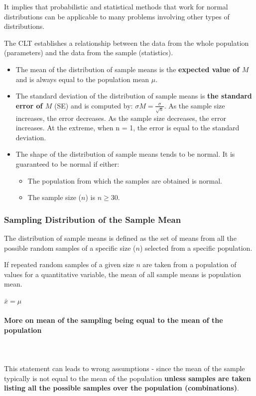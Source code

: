 \documentclass{article}
\begin{document}
It implies that probabilistic and statistical methods that work for normal distributions can be applicable to many problems involving other types of distributions.

The CLT establishes a relationship between the data from the whole population (parameters) and the data from the sample (statistics). 

\begin{itemize}
    \item The mean of the distribution of sample means is the \textbf{expected value of $M$} and is always equal to the population mean $\mu$.
    \item The standard deviation of the distribution of sample means is \textbf{the standard error of $M$} (SE) and is computed by: $\sigma{M} = \frac{\sigma}{\sqrt{n}}$. As the sample size increases, the error decreases.  As the sample size decreases, the error increases.  At the extreme, when n = 1, the error is equal to the standard deviation.
    \item The shape of the distribution of sample means tends to be normal. It is guaranteed to be normal if either: 
    \begin{itemize}
        \item The population from which the samples are obtained is normal.
        \item The sample size ($n$) is $n \geq 30$.
    \end{itemize}  
\end{itemize}

\subsubsection{Sampling Distribution of the Sample Mean}
The distribution of sample means is defined as the set of means from all the possible random samples of a specific size ($n$) selected from a specific population. 

If repeated random samples of a given size $n$ are taken from a population of values for a quantitative variable, the mean of all sample means is population mean.

$\bar{x} = \mu $

\paragraph{More on mean of the sampling being equal to the mean of the population}\mbox{} \\
\mbox{} \\
This statement can leads to wrong assumptions - since the mean of the sample typically is not equal to the mean of the population \textbf{unless samples are taken listing all the possible samples over the population (combinations)}.
\end{document}
